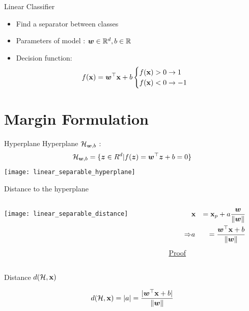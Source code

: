 \documentclass[11pt, pdf, compress, handout]{beamer}
\begin{document}
 
 \begin{frame}{Linear Classifier}
   \begin{itemize}
   \item Find a separator between classes
   \item  Parameters of model  : ${\boldsymbol{w}} \in {\mathbb{R}}^{d}, b \in {\mathbb{R}}$
   \item Decision function:
     $$f({\mathbf{x}}) = {\boldsymbol{w}}^\top {\mathbf{x}} + b
     \begin{cases}
       f({\mathbf{x}}) > 0 \to 1 \\
       f({\mathbf{x}}) < 0 \to -1 \\
     \end{cases}
$$
   \end{itemize}
\end{frame}
\section{Margin Formulation}
\label{sec:org48fba1b}
\begin{frame}[label={sec:org6952ba1}]{Hyperplane}
  Hyperplane ${\mathcal{H}}_{{\boldsymbol{w}},b}$ :
  $${\mathcal{H}}_{{\boldsymbol{w}},b} = \{{\boldsymbol{z}} \in R^{d} | 
  f({\boldsymbol{z}}) = {\boldsymbol{w}}^\top {\boldsymbol{z}} +b = 0 \}
  $$
  \texttt{[image: linear\_separable\_hyperplane]}
\end{frame}
\begin{frame}[label={sec:orgd9ceaee}]{Distance to the hyperplane}
  \begin{columns}
    \begin{column}{.6\textwidth}
      \begin{center}
        \texttt{[image: linear\_separable\_distance]}
      \end{center}
    \end{column}
    \begin{column}{.4\textwidth}
      \begin{eqnarray*}
        &  {\mathbf{x}} & = {\mathbf{x}}_p + a \frac{{\boldsymbol{w}}}{\|{\boldsymbol{w}}\|} \\
        \Rightarrow & a & = \frac{{\boldsymbol{w}}^\top {\mathbf{x}} + b}{\| {\boldsymbol{w}} \|}
      \end{eqnarray*}
      \href{https://drive.google.com/file/d/1fGQUw8QEzcfmolNy9gDlvddfdILiAFsO/view?usp=sharing}{Proof}
    \end{column}
  \end{columns}
  \begin{block}{Distance $d({\mathcal{H}},{\mathbf{x}})$}
    \begin{center}
    $$d({\mathcal{H}},{\mathbf{x}}) = |a| = \frac{|{\boldsymbol{w}}^\top {\mathbf{x}} + b|}{\| {\boldsymbol{w}} \|}$$
  \end{center}

  \end{block}
\end{frame}
\end{document}
